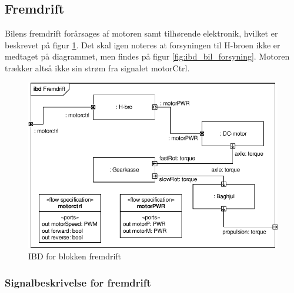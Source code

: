 \subsection{Fremdrift}

Bilens fremdrift forårsages af motoren samt tilhørende elektronik, hvilket er beskrevet på figur \ref{fig:ibd_fremdrift}. Det skal igen noteres at forsyningen til H-broen ikke er medtaget på diagrammet, men findes på figur \ref{fig:ibd_bil_forsyning}. Motoren trækker altså ikke sin strøm fra signalet motorCtrl. 

\begin{figure}[h]
\centering
\includegraphics[scale=1]{../fig/diagrammer/bil/ibd_fremdrift.pdf}
\caption{IBD for blokken fremdrift}
\label{fig:ibd_fremdrift}
\end{figure}

\clearpage

\subsubsection{Signalbeskrivelse for fremdrift}

